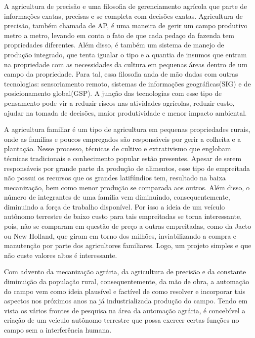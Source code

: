 A agricultura de precisão e uma filosofia de gerenciamento agrícola que parte de informações exatas, precisas e se completa com decisões exatas. Agricultura de precisão, também chamada de AP, é uma maneira de gerir um campo produtivo metro a metro, levando em conta o fato de que cada pedaço da fazenda tem propriedades diferentes\cite{Tschiedel2002}. Além disso, é também um sistema de manejo de produção integrado, que tenta igualar o tipo e a quantia de insumos que entram na propriedade com as necessidades da cultura em pequenas áreas dentro de um campo da propriedade. Para tal, essa filosofia anda de mão dadas com outras tecnologias: sensoriamento remoto, sistemas de informações geográficas(SIG) e de posicionamento global(GSP). A junção das tecnologias com esse tipo de pensamento pode vir a reduzir riscos nas atividades agrícolas, reduzir custo, ajudar na tomada de decisões, maior produtividade e menor impacto ambiental.

A agricultura familiar é um tipo  de agricultura em pequenas propriedades rurais, onde as famílias e poucos empregados são responsáveis por gerir a colheita e a plantação. Nesse processo, técnicas de cultivo e extrativismo que englobam técnicas tradicionais e conhecimento popular estão presentes\cite{Materia2017}. Apesar de serem responsáveis por grande parte da produção de alimentos, esse tipo de empreitada não possui os recursos que os grandes latifúndios tem, resultado na baixa mecanização, bem como menor produção se comparada aos outros. Além disso, o número de integrantes de uma família vem diminuindo, consequentemente, diminuindo a força de trabalho disponível.  Por isso a ideia de um veículo autônomo terrestre de baixo custo para tais empreitadas se torna interessante, pois, não se comparam em questão de preço a outras empreitadas, como da Jacto ou New Holland, que giram em torno dos milhões, inviabilizando a compra e manutenção por parte dos agricultores familiares. Logo, um projeto simples e que não custe valores altos é interessante.

Com advento da mecanização agrária, da agricultura de precisão e da constante diminuição da população rural, consequentemente, da mão de obra, a automação do campo vem como ideia plausível e factível de como resolver e incorporar tais aspectos nos próximos anos na já industrializada produção do campo. Tendo em vista os vários frontes de pesquisa na área da automação agrária, é concebível a criação de um veículo autônomo terrestre que possa exercer certas funções no campo sem a interferência humana. 

